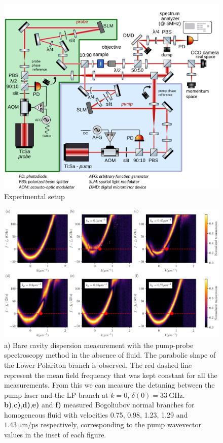  \begin{figure}[p]
    \centering
    \includegraphics[width=1\textwidth]{chap_custom_st/fig/set_up_spacetime.pdf}
    \caption{Experimental setup}
    \label{fig:setup}
\end{figure}
\clearpage



\bigskip

\begin{figure}[t!]
    \centering
    \includegraphics[width=1\textwidth]{chap_custom_st/fig/homogeneous_doppler.pdf}
    \caption{a) Bare cavity dispersion measurement with the pump-probe spectroscopy method in the absence of fluid. 
    The parabolic shape of the Lower Polariton branch is observed.  
    The red dashed line represent the mean field frequency that was kept constant for all the measurements. 
    From this we can measure the detuning between the pump laser and the LP branch at $k=0$,
     $\delta(0) = \SI{33}{\giga\hertz}$. \textbf{b)},\textbf{c)},\textbf{d)},\textbf{e)} and \textbf{f)} measured Bogoliubov normal branches for homogeneous fluid with velocities 0.75, 0.98, 1.23, 1.29 and $\SI{1.43}{\micro \meter \per \pico \second}$ respectively, corresponding 
    to the pump wavevector values in the inset of each figure.}
     
    \label{fig:homogeneous_fluid_bogo}
\end{figure}

